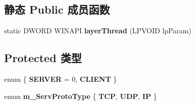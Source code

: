 \subsection*{静态 Public 成员函数}
\begin{DoxyCompactItemize}
\item 
\mbox{\label{class_c_layer_interface_a59d79b4c294ca20c2a761a4f1f737e24}} 
static D\+W\+O\+RD W\+I\+N\+A\+PI {\bfseries layer\+Thread} (L\+P\+V\+O\+ID lp\+Param)
\end{DoxyCompactItemize}
\subsection*{Protected 类型}
\begin{DoxyCompactItemize}
\item 
\mbox{\label{class_c_layer_interface_a033fd0915604b00e58a68115d414a50a}} 
enum \{ {\bfseries S\+E\+R\+V\+ER} = 0, 
{\bfseries C\+L\+I\+E\+NT}
 \}
\item 
\mbox{\label{class_c_layer_interface_abcab6cee3a2b9a396b287124f4204756}} 
enum {\bfseries m\+\_\+\+Serv\+Proto\+Type} \{ {\bfseries T\+CP}, 
{\bfseries U\+DP}, 
{\bfseries IP}
 \}
\end{DoxyCompactItemize}
